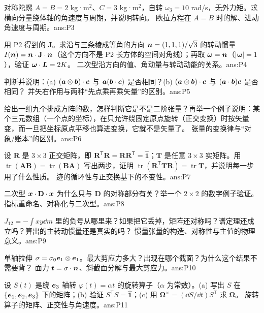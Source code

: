 \documentclass[11pt]{ctexart}
\newcommand{\ten}[1]{\mathbf{#1}}
\newcommand{\unitd}{\hat{\ten{1}}}
\newcommand{\tr}{\operatorname{tr}}
\begin{document}
{对称陀螺 $A=B=2$ kg·m$^2$、$C=3$ kg·m$^2$，自转 $\omega_3=10$ rad/s，无外力矩。求横向分量绕体轴的角速度与周期，并说明转向。}
{欧拉方程在 $A=B$ 时的解、进动角速度与周期。}{ans:P3}

{用 P2 得到的 $\ten J$。求沿与三条棱成等角的方向 $\boldsymbol{n}=(1,1,1)/\sqrt3$ 的转动惯量 $I(\vect n)=\vect n\cdot\ten J\cdot\vect n$（这个方向不是 P2 长方体的空间对角线）；再取 $\boldsymbol\omega=\boldsymbol{n}$（$|\boldsymbol\omega|=1$），验证 $\boldsymbol\omega\cdot\boldsymbol{L}=2K$。}
{二次型沿方向的值、角动量与转动动能的关系。}{ans:P4}

{判断并说明：(a) $(\boldsymbol{a}\otimes\boldsymbol{b})\cdot\boldsymbol{c}$ 与 $\boldsymbol{a}(\boldsymbol{b}\cdot\boldsymbol{c})$ 是否相同？(b) $(\boldsymbol{a}\otimes\boldsymbol{b})\cdot\boldsymbol{c}$ 与 $(\boldsymbol{a}\cdot\boldsymbol{b})\boldsymbol{c}$ 是否相同？}
{并矢右作用与两种“先点乘再乘矢量”的区别。}{ans:P5}

{给出一组九个排成方阵的数，怎样判断它是不是二阶张量？再举一个例子说明：某个三元数组（一个点的坐标），在只允许绕固定原点旋转（正交变换）时按矢量变，而一旦把坐标原点平移也算进变换，它就不是矢量了。}
{张量的变换律与“对象/账本”的区别。}{ans:P6}

{设 $\ten R$ 是 $3\times3$ 正交矩阵，即 $\ten R^{\mathsf T}\ten R=\ten R\ten R^{\mathsf T}=\unitd$；$\ten T$ 是任意 $3\times3$ 实矩阵。用 $\tr(\ten A\ten B)=\tr(\ten B\ten A)$ 写出两步，证明 $\tr(\ten R^{\mathsf T}\ten T\ten R)=\tr\ten T$，并说明每一步用了什么性质。}
{迹的循环性与正交换基下的不变性。}{ans:P7}

{二次型 $\vect x\cdot\ten D\cdot\vect x$ 为什么只与 $\ten D$ 的对称部分有关？举一个 $2\times2$ 的数字例子验证。}
{指标重命名、对称化与二次型。}{ans:P8}

{$J_{12}=-\int xy\dd m$ 里的负号从哪里来？如果把它丢掉，矩阵还对称吗？谱定理还成立吗？算出的主转动惯量还是真实的吗？}
{惯量张量的构造、对称性与主值的物理意义。}{ans:P9}

{单轴拉伸 $\ten\sigma=\sigma_0\vect e_1\otimes\vect e_1$。最大剪应力多大？出现在哪个截面？为什么这个结果不需要背？}
{面力 $\vect t=\ten\sigma\cdot\vect n$、斜截面分解与最大剪应力。}{ans:P10}

{设 $S(t)$ 是绕 $\boldsymbol{e}_3$ 轴转 $\varphi(t)=\alpha t$ 的旋转算子（$\alpha$ 为常数）。(a) 写出 $S$ 在 $\{\boldsymbol{e}_1,\boldsymbol{e}_2,\boldsymbol{e}_3\}$ 下的矩阵；(b) 验证 $S^{\mathsf T}S=\unitd$；(c) 用 $\boldsymbol\Omega^{\times}=(\dd S/\dd t)S^{\mathsf T}$ 求 $\boldsymbol\Omega$。}
{旋转算子的矩阵、正交性与角速度。}{ans:P11}
\end{document}
